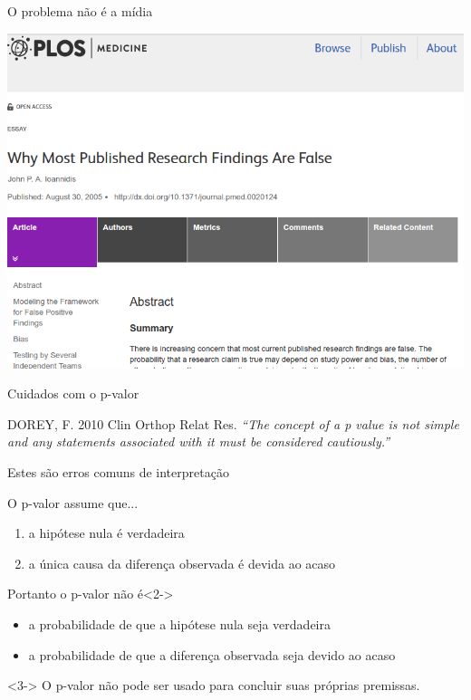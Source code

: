 \documentclass{beamer}
\begin{document}
\begin{frame}{{\small O problema não é a mídia}}
  \begin{center}
    \includegraphics[height=.9\textheight]{Cap10-11/Ioannidis}
  \end{center}
\end{frame}

\begin{frame}{Cuidados com o p-valor}
    \begin{block}{{\small DOREY, F. 2010 Clin Orthop Relat Res.}}
    \small
    {\em ``The concept of a p value is not simple and any statements
    associated with it must be considered cautiously.''}
  \end{block}
\end{frame}

\begin{frame}{{\small Estes são erros comuns de interpretação}}
  \small
  \begin{block}{O p-valor assume que...}
    \small
    \begin{enumerate}
      \footnotesize
    \item a hipótese nula é \alert<1>{verdadeira}
    \item a \alert<1>{única} causa da diferença observada é devida ao acaso
    \end{enumerate}
  \end{block}
  \begin{block}{Portanto o p-valor \alert{não é}}<2->
    \begin{itemize}
      \footnotesize
    \item a probabilidade de que a hipótese nula seja verdadeira
    \item a probabilidade de que a diferença observada seja devido ao
      acaso
    \end{itemize}
    \begin{block}{}<3->
      \footnotesize
      O p-valor não pode ser usado para concluir suas próprias
      premissas.
    \end{block}
  \end{block}
\end{frame}
\end{document}
